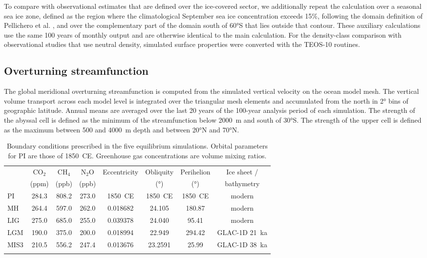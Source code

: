 \documentclass[pdflatex,sn-nature]{sn-jnl}
\begin{document}
To compare with observational estimates that are defined over the ice-covered sector, we additionally repeat the calculation over a seasonal sea ice zone, defined as the region where the climatological September sea ice concentration exceeds 15\%, following the domain definition of Pellichero et al. \cite{Pellichero2018}, and over the complementary part of the domain south of 60°S that lies outside that contour. These auxiliary calculations use the same 100 years of monthly output and are otherwise identical to the main calculation. For the density-class comparison with observational studies that use neutral density, simulated surface properties were converted with the TEOS-10 routines.

\subsection{Overturning streamfunction}

The global meridional overturning streamfunction is computed from the simulated vertical velocity on the ocean model mesh. The vertical volume transport across each model level is integrated over the triangular mesh elements and accumulated from the north in 2° bins of geographic latitude. Annual means are averaged over the last 20 years of the 100-year analysis period of each simulation. The strength of the abyssal cell is defined as the minimum of the streamfunction below 2000~m and south of 30°S. The strength of the upper cell is defined as the maximum between 500 and 4000~m depth and between 20°N and 70°N.

\begin{table}[htbp]
\centering
\caption{Boundary conditions prescribed in the five equilibrium simulations. Orbital parameters for PI are those of 1850~CE. Greenhouse gas concentrations are volume mixing ratios.\label{tab:bc}}
\begin{tabular}{lccccccc}
\toprule
 & CO$_2$ & CH$_4$ & N$_2$O & Eccentricity & Obliquity & Perihelion & Ice sheet / \\
 & (ppm) & (ppb) & (ppb) & & (°) & (°) & bathymetry \\
\midrule
PI   & 284.3 & 808.2 & 273.0 & 1850~CE  & 1850~CE & 1850~CE & modern \\
MH   & 264.4 & 597.0 & 262.0 & 0.018682 & 24.105  & 180.87  & modern \\
LIG  & 275.0 & 685.0 & 255.0 & 0.039378 & 24.040  & 95.41   & modern \\
LGM  & 190.0 & 375.0 & 200.0 & 0.018994 & 22.949  & 294.42  & GLAC-1D 21~ka \\
MIS3 & 210.5 & 556.2 & 247.4 & 0.013676 & 23.2591 & 25.99   & GLAC-1D 38~ka \\
\botrule
\end{tabular}
\end{table}
\end{document}
